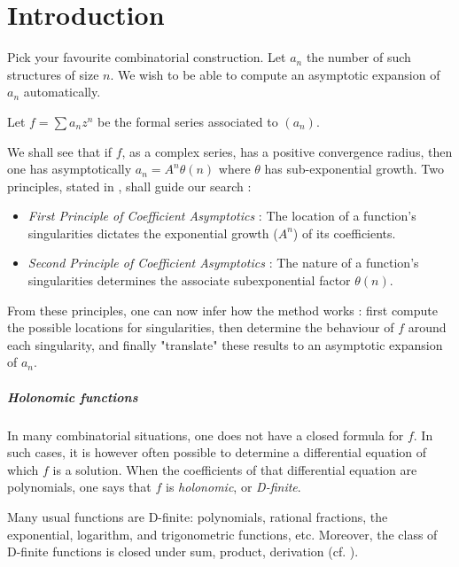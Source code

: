 \documentclass[../main.tex]{subfiles}
\begin{document}
\chapter{Introduction}

Pick your favourite combinatorial construction. Let $a_n$ the number of such structures of size $n$. We wish to be able to compute an asymptotic expansion of $a_n$ automatically.

Let $f = \sum a_n z^n$ be the formal series associated to $(a_n)$.

We shall see that if $f$, as a complex series, has a positive convergence radius, then one has asymptotically $a_n = A^n \theta(n)$ where $\theta$ has sub-exponential growth.
Two principles, stated in \cite{Flajolet2009}, shall guide our search :

\begin{itemize}
	\item	\emph{First Principle of Coefficient Asymptotics} : The location of a function’s
			singularities dictates the exponential growth ($A^n$) of its coefficients.
	
	\item	\emph{Second Principle of Coefficient Asymptotics} : The nature of a function’s
			singularities determines the associate subexponential factor $\theta(n)$.
\end{itemize}

From these principles, one can now infer how the method works : first compute the possible locations for singularities, then determine the behaviour of $f$ around each singularity, and finally "translate" these results to an asymptotic expansion of $a_n$.

\paragraph{Holonomic functions}

In many combinatorial situations, one does not have a closed formula for $f$. In such cases, it is however often possible to determine a differential equation of which $f$ is a solution. When the coefficients of that differential equation are polynomials, one says that $f$ is \emph{holonomic}, or \emph{D-finite}.

Many usual functions are D-finite: polynomials, rational fractions, the exponential, logarithm, and trigonometric functions, etc. Moreover, the class of D-finite functions is closed under sum, product, derivation (cf. \cite{Melczer2020}).
\end{document}
